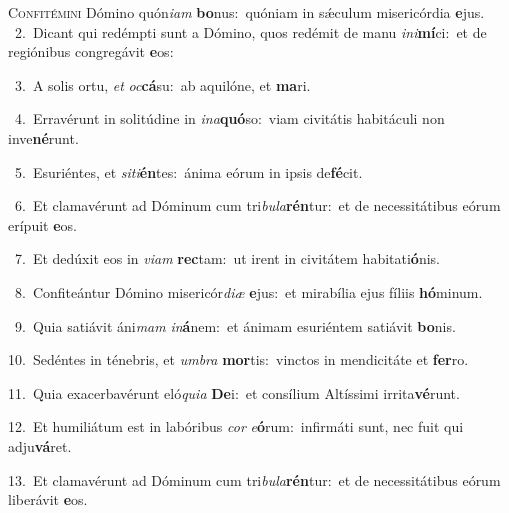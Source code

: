 \lettrine{\initial\textcolor{\initialcolor}{C}}{onfitémini} Dómino quón\-\textit{i}\-\textit{am} \textbf{bo}\-nus:~\star quóniam in sǽculum misericórdia \textbf{e}\-jus.\\
{\numbfont\textcolor{\numbcolor}{~2.}}~Dicant qui redémpti sunt a Dómino, quos redémit de manu \textit{in}\-\textit{i}\textbf{mí}ci:~\star et de regiónibus congregávit \textbf{e}\-os:\par
{\numbfont\textcolor{\numbcolor}{~3.}}~A solis ortu, \textit{et} \textit{oc}\-\textbf{cá}su:~\star ab aquilóne, et \textbf{ma}\-ri.\par
{\numbfont\textcolor{\numbcolor}{~4.}}~Erravérunt in solitúdine in \textit{in}\-\textit{a}\textbf{quó}so:~\star viam civitátis habitáculi non inve\-\textbf{né}\-runt.\par
{\numbfont\textcolor{\numbcolor}{~5.}}~Esuriéntes, et \textit{si}\-\textit{ti}\textbf{én}tes:~\star ánima eórum in ipsis de\-\textbf{fé}\-cit.\par
{\numbfont\textcolor{\numbcolor}{~6.}}~Et clamavérunt ad Dóminum cum tri\-\textit{bu}\-\textit{la}\textbf{rén}tur:~\star et de necessitátibus eórum erípuit \textbf{e}\-os.\par
{\numbfont\textcolor{\numbcolor}{~7.}}~Et dedúxit eos in \textit{vi}\-\textit{am} \textbf{rec}\-tam:~\star ut irent in civitátem habitati\-\textbf{ó}\-nis.\par
{\numbfont\textcolor{\numbcolor}{~8.}}~Confiteántur Dómino misericór\-\textit{di}\-\textit{æ} \textbf{e}\-jus:~\star et mirabília ejus fíliis \textbf{hó}\-minum.\par
{\numbfont\textcolor{\numbcolor}{~9.}}~Quia satiávit áni\textit{mam} \textit{in}\-\textbf{á}nem:~\star et ánimam esuriéntem satiávit \textbf{bo}\-nis.\par
{\numbfont\textcolor{\numbcolor}{10.}}~Sedéntes in ténebris, et \textit{um}\-\textit{bra} \textbf{mor}\-tis:~\star vinctos in mendicitáte et \textbf{fer}\-ro.\par
{\numbfont\textcolor{\numbcolor}{11.}}~Quia exacerbavérunt eló\-\textit{qui}\-\textit{a} \textbf{De}\-i:~\star et consílium Altíssimi irrita\-\textbf{vé}\-runt.\par
{\numbfont\textcolor{\numbcolor}{12.}}~Et humiliátum est in labóribus \textit{cor} \textit{e}\-\textbf{ó}rum:~\star infirmáti sunt, nec fuit qui adju\-\textbf{vá}\-ret.\par
{\numbfont\textcolor{\numbcolor}{13.}}~Et clamavérunt ad Dóminum cum tri\-\textit{bu}\-\textit{la}\textbf{rén}tur:~\star et de necessitátibus eórum liberávit \textbf{e}\-os.\par
